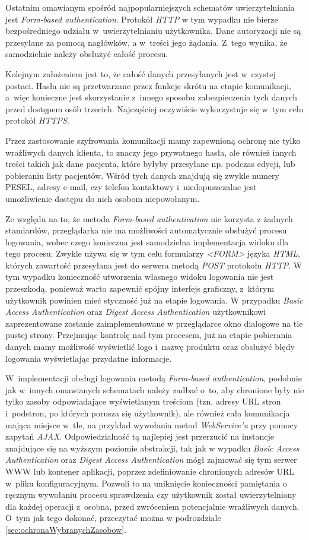 \documentclass[11pt]{aghdpl}
\begin{document}
Ostatnim omawianym spośród najpopularniejszych schematów uwierzytelniania jest \emph{Form-based authentication}. Protokół \emph{HTTP} w tym wypadku nie bierze bezpośredniego udziału w~uwierzytelnianiu użytkownika. Dane autoryzacji nie są przesyłane za pomocą nagłówków, a w~treści jego żądania. Z~tego wynika, że samodzielnie należy obsłużyć całość procesu.

Kolejnym założeniem jest to, że całość danych przesyłanych jest w~czystej postaci. Hasła nie są przetwarzane przez funkcje skrótu na etapie komunikacji, a~więc konieczne jest skorzystanie z~innego sposobu zabezpieczenia tych danych przed dostępem osób trzecich. Najczęściej oczywiście wykorzystuje się w~tym celu protokół \emph{HTTPS}.

Przez zastosowanie szyfrowania komunikacji mamy zapewnioną ochronę nie tylko wrażliwych danych klienta, to znaczy jego prywatnego hasła, ale również innych treści takich jak dane pacjenta, które byłyby przesyłane np. podczas edycji, lub pobieraniu listy pacjentów. Wśród tych danych znajdują się zwykle numery PESEL, adresy e-mail, czy telefon kontaktowy i~niedopuszczalne jest umożliwienie dostępu do nich osobom niepowołanym.

Ze względu na to, że metoda \emph{Form-based authentication} nie korzysta z żadnych standardów, przeglądarka nie ma możliwości automatycznie obsłużyć procesu logowania, wobec czego konieczna jest samodzielna implementacja widoku dla tego procesu. Zwykle używa się w tym celu formularzy \emph{<FORM>} języka \emph{HTML}, których zawartość przesyłana jest do serwera metodą \emph{POST} protokołu \emph{HTTP}. W tym wypadku konieczność utworzenia własnego widoku logowania nie jest przeszkodą, ponieważ warto zapewnić spójny interfejs graficzny, z~którym użytkownik powinien mieć styczność już na etapie logowania. W przypadku \emph{Basic Access Authentication} oraz \emph{Digest Access Authentication} użytkownikowi zaprezentowane zostanie zaimplementowane w przeglądarce okno dialogowe na tle pustej strony. Przejmując kontrolę nad tym procesem, już na etapie pobierania danych mamy możliwość wyświetlić logo i~nazwę produktu oraz obsłużyć błędy logowania wyświetlając przydatne informacje.

W~implementacji obsługi logowania metodą \emph{Form-based authentication}, podobnie jak w~innych omawianych schematach należy zadbać o~to, aby chronione były nie tylko zasoby odpowiadające wyświetlanym treściom (tzn. adresy URL stron i~podstron, po których porusza się użytkownik), ale również cała komunikacja mająca miejsce w~tle, na przykład wywołania metod \emph{WebService'u} przy pomocy zapytań \emph{AJAX}. Odpowiedzialność tą najlepiej jest przerzucić na instancje znajdujące się na wyższym poziomie abstrakcji, tak jak w wypadku \emph{Basic Access Authentication} oraz \emph{Digest Access Authentication} mógł zajmować się tym serwer WWW lub kontener aplikacji, poprzez zdefiniowanie chronionych adresów URL w~pliku konfiguracyjnym. Pozwoli to na uniknięcie konieczności pamiętania o ręcznym wywołaniu procesu sprawdzenia czy użytkownik został uwierzytelniony dla każdej operacji z~osobna, przed zwróceniem potencjalnie wrażliwych danych. O~tym jak tego dokonać, przeczytać można w podrozdziale \ref{sec:ochronaWybranychZasobow}.
\end{document}
